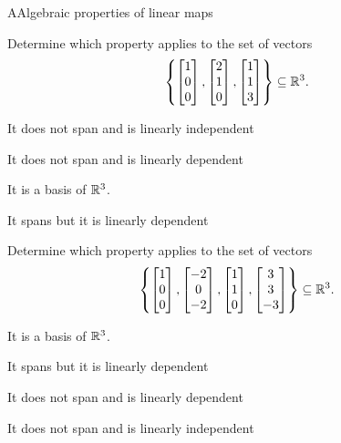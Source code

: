 \documentclass{article}[12pt]
\begin{document}
\begin{module}{A}{Algebraic properties of linear maps}
\begin{readinessAssuranceTest}
  \item Determine which property applies to the set of vectors $$\left\{ \begin{bmatrix}  1 \\ 0 \\ 0 \end{bmatrix}, \begin{bmatrix} 2 \\ 1 \\ 0 \end{bmatrix} , \begin{bmatrix} 1 \\ 1 \\ 3 \end{bmatrix} \right\}\subseteq \mathbb{R}^3.$$
  \begin{readinessAssuranceTestChoices}
  \item It does not span and is linearly independent
  \item It does not span and is linearly dependent
  \item It is a basis of $\mathbb{R}^3$. %
  \item It spans but it is linearly dependent
  \end{readinessAssuranceTestChoices}


  \item Determine which property applies to the set of vectors $$\left\{ \begin{bmatrix}  1 \\ 0 \\ 0 \end{bmatrix}, \begin{bmatrix} -2 \\ 0 \\ -2 \end{bmatrix} , \begin{bmatrix} 1 \\ 1 \\ 0 \end{bmatrix} , \begin{bmatrix} 3 \\ 3 \\ -3 \end{bmatrix}\right\}\subseteq \mathbb{R}^3.$$
  \begin{readinessAssuranceTestChoices}
  \item It is a basis of $\mathbb{R}^3$.
  \item It spans but it is linearly dependent %
  \item It does not span and is linearly dependent
  \item It does not span and is linearly independent
  \end{readinessAssuranceTestChoices}



\end{readinessAssuranceTest}
\end{module}
\end{document}
